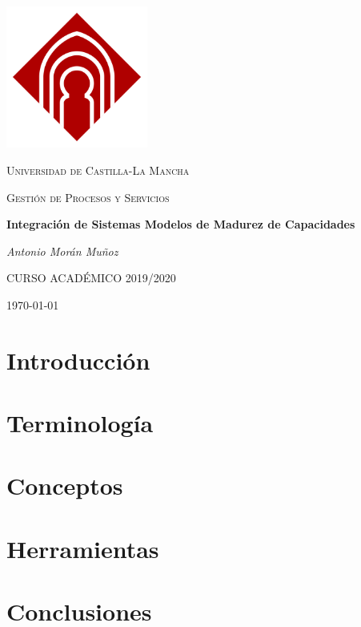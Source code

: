 \documentclass[12pt,a4paper]{book}
\title{\trabajo}
\author{Antonio Morán Muñoz}
\date{Febrero 2020}
\author{Antonio Morán Muñoz}
\title{\trabajo}
\newcommand{\asignatura}{Gestión de Procesos y Servicios}
\newcommand{\trabajo}{Integración de Sistemas Modelos de Madurez de Capacidades}
\begin{document}
\begin{titlepage}
\thispagestyle{empty}
\centering
	\includegraphics[width=0.35\textwidth]{Images/castilla.png}\par\vspace{1cm}
	{\scshape\LARGE Universidad de Castilla-La Mancha \par}
	\vspace{1cm}
	{\scshape\Large \asignatura\par}
	\vspace{1.5cm}
	{\huge\bfseries \trabajo\par}
	\vspace{2cm}
	{\Large\itshape Antonio Morán Muñoz\par}

	\vfill

	{CURSO ACADÉMICO 2019/2020}
	\vfill
	{\large \today\par}
\end{titlepage}

\frontmatter
\tableofcontents

\mainmatter
\chapter{Introducción}\label{sec:introduccion}


\chapter{Terminología}\label{sec:terminologia}


\chapter{Conceptos}\label{sec:conceptos}


\chapter{Herramientas}\label{sec:herramientas}


\chapter{Conclusiones}\label{sec:conclusiones}



\newpage
\printbibliography
\end{document}
